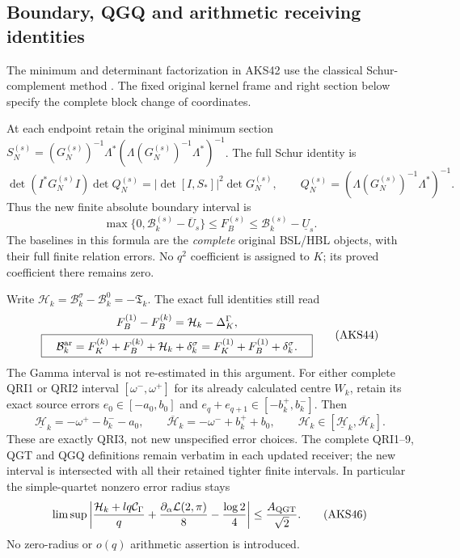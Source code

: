 \documentclass[11pt,a4paper]{article}
\begin{document}
\subsection{Boundary, QGQ and arithmetic receiving identities}


The minimum and determinant factorization in AKS42 use the
classical Schur-complement method
\cite[\S2.1, (2.3)--(2.4)]{human:boyd1994}.
The fixed original kernel frame and right section below specify
the complete block change of coordinates.

At each endpoint retain the original minimum section
$S_N^{(s)}=(G_N^{(s)})^{-1}\Lambda^*
(\Lambda(G_N^{(s)})^{-1}\Lambda^*)^{-1}$. The full Schur identity is
\[
 \det(I^*G_N^{(s)}I)\det Q_N^{(s)}
       =|\det[I,S_*]|^2\det G_N^{(s)},\qquad
 Q_N^{(s)}=(\Lambda(G_N^{(s)})^{-1}\Lambda^*)^{-1}.
 \tag{AKS42}
\]
Thus the new finite absolute boundary interval is
\[
 \max\{0,\mathcal B_k^{(s)}-\overline U_s\}
       \le F_B^{(s)}\le\mathcal B_k^{(s)}-\underline U_s.
 \tag{AKS43}
\]
The baselines in this formula are the \emph{complete} original BSL/HBL
objects, with their full finite relation errors. No $q^2$ coefficient is
assigned to $K$; its proved coefficient there remains zero.

Write $\mathcal H_k=\mathcal B_k^\sigma-\mathcal B_k^0=-\mathfrak T_k$.
The exact full identities still read
\[
\begin{gathered}
 F_B^{(1)}-F_B^{(k)}=\mathcal H_k-\Delta_K^\Gamma,\\
 \boxed{\quad\mathcal B_k^{\rm ar}
   =F_K^{(k)}+F_B^{(k)}+\mathcal H_k+\delta_k^\sigma
   =F_K^{(1)}+F_B^{(1)}+\delta_k^\sigma.\quad}
\end{gathered}\tag{AKS44}
\]
The Gamma interval is not re-estimated in this argument. For either
complete QRI1 or QRI2 interval $[\omega^-,\omega^+]$ for its already
calculated centre $W_k$, retain its exact source errors
$e_0\in[-a_0,b_0]$ and $e_q+e_{q+1}\in[-b_k^+,b_k^-]$. Then
\[
 \underline{\mathcal H}_k=-\omega^+-b_k^--a_0,
 \qquad\overline{\mathcal H}_k=-\omega^-+b_k^++b_0,
 \qquad \mathcal H_k\in
       [\underline{\mathcal H}_k,\overline{\mathcal H}_k].
 \tag{AKS45}
\]
These are exactly QRI3, not new unspecified error choices. The complete
QRI1--9, QGT and QGQ definitions remain verbatim in each updated receiver;
the new interval is intersected with all their retained tighter finite
intervals. In particular the simple-quartet nonzero error radius stays
\[
 \limsup\left|
 \frac{\mathcal H_k+lq\mathcal C_\Gamma}{q}
       +\frac{\partial_\alpha\mathcal L(2,\pi)}8
       -\frac{\log2}{4}\right|\le\frac{A_{\rm QGT}}{\sqrt2}.
 \tag{AKS46}
\]
No zero-radius or $o(q)$ arithmetic assertion is introduced.
\end{document}
